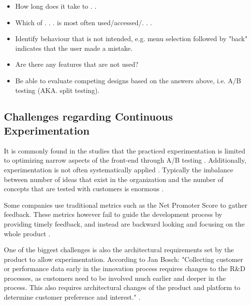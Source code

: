 \documentclass[english]{tktltiki2}
\theoremstyle{definition}
\theoremstyle{remark}
\begin{document}
\begin{itemize}
\item  How long does it take to . . 
\item  Which of . . . is most often used/accessed/. . .
\item  Identify behaviour that is not intended, e.g. menu selection followed by "back" indicates that the user made a mistake.
\item  Are there any features that are not used?
\item  Be able to evaluate competing designs based on the answers above, i.e. A/B testing (AKA. split testing).
\end{itemize}

\subsection{Challenges regarding Continuous Experimentation}
It is commonly found in the studies that the practiced experimentation is limited to optimizing narrow aspects of the front-end through A/B testing \cite{bosch2012building}. Additionally, experimentation is not often systematically applied \cite{bosch2012building}. Typically the imbalance between number of ideas that exist in the organization and the number of concepts that are tested with customers is enormous \cite{bosch2012building}. 

Some companies use traditional metrics such as the Net Promoter Score \cite{reichheld2003one} to gather feedback. These metrics however fail to guide the development process by providing timely feedback, and instead are backward looking and focusing on the whole product \cite{bosch2012building}.

One of the biggest challenges is also the architectural requirements set by the product to allow experimentation. According to Jan Bosch: "Collecting customer or performance data early in the innovation process requires changes to the R\&D processes, as customers need to be involved much earlier and deeper in the process. This also requires architectural changes of the product and platform to determine customer preference and interest." \cite{bosch2012building}.
\end{document}
